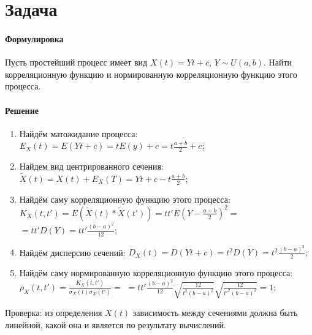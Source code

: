 \documentclass{article}
\begin{document}
    \section{Задача}
    \paragraph{Формулировка}
        Пусть простейший процесс имеет вид $X(t) = Y t + c$, $Y \sim U(a, b)$. Найти корреляционную функцию и нормированную корреляционную функцию этого процесса.
    \paragraph{Решение}
        \begin{enumerate}
            \item Найдём матожидание процесса: $E_X(t) = E(Y t + c) = t E(y) + c = t \frac{a + b}{2} + c$;
            \item Найдем вид центрированного сечения: $\tilde{X}(t) = X(t) + E_X(T) = Y t + c - t \frac{a + b}{2}$;
            \item Найдём саму корреляционную функцию этого процесса: $K_X(t, t') = E(\tilde{X}(t) * \tilde{X}(t')) = t t' E(Y - \frac{a + b}{2})^2 =$
            \newline
            $= t t' D(Y) = t t' \frac{(b - a)^2}{12}$;
            \item Найдём дисперсию сечений: $D_X(t) = D(Y t + c) = t^2 D(Y) = t^2 \frac{(b - a)^2}{2};$
            \item Найдём саму нормированную корреляционную функцию этого процесса: $\rho_X(t, t') = \frac{K_X(t, t')}{\sigma_X(t) \sigma_X(t')} =$ 
            \newline
            $= t t' \frac{(b - a)^2}{12} \sqrt{\frac{12}{t^2 (b - a)^2}} \sqrt{\frac{12}{t'^2(b - a)^2}} = 1$;
        \end{enumerate}
        Проверка: из определения $X(t)$ зависимость между сечениями должна быть линейной, какой она и является по результату вычислений.
\end{document}
